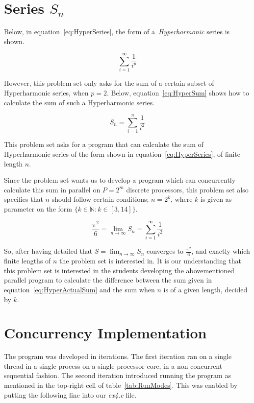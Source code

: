 \documentclass[fontsize=11pt,paper=a4,titlepage]{report}
\begin{document}
\section{Series $S_n$}

Below, in equation~\ref{eq:HyperSeries}, the form of a~\textit{Hyperharmonic}
series is shown.

\begin{equation}
	\sum_{i=1}^{\infty} \frac{1}{i^p}
	\label{eq:HyperSeries}
\end{equation}

However, this problem set only asks for the sum of a certain subset of
Hyperharmonic series, when $p = 2$. Below, equation~\ref{eq:HyperSum} shows how
to calculate the sum of such a Hyperharmonic series.

\begin{equation}
	S_n = \sum_{i=1}^{n} \frac{1}{i^2}
	\label{eq:HyperSum}
\end{equation}

This problem set asks for a program that can calculate the sum of Hyperharmonic
series of the form shown in equation~\ref{eq:HyperSeries}, of finite length $n$.

Since the problem set wants us to develop a program which can concurrently
calculate this sum in parallel on $P = 2^m$ discrete processors, this problem
set also specifies that $n$ should follow certain conditions; $n = 2^k$, where
$k$ is given as parameter on the form $\{k \in \mathbb{N} : k \in [3, 14]\}$.

\begin{equation}
	\frac{\pi^2}{6} = \lim_{n \to \infty}S_n = \sum_{i=1}^{\infty} \frac{1}{i^2}
	\label{eq:HyperActualSum}
\end{equation}

So, after having detailed that $S = \lim_{n \to \infty}S_n$ converges to $\frac{
\pi^2}{6}$, and exactly which finite lengths of $n$ the problem set is
interested in. It is our understanding that this problem set is interested in
the students developing the abovementioned parallel program to calculate the
difference between the sum given in equation~\ref{eq:HyperActualSum} and the sum
when $n$ is of a given length, decided by $k$.

\section{Concurrency Implementation}

The program was developed in iterations. The first iteration ran on a single
thread in a single process on a single processor core, in a non-concurrent
sequential fashion. The second iteration introduced running the program as
mentioned in the top-right cell of table~\ref{tab:RunModes}. This was enabled by
putting the following line into our \textit{ex4.c} file.
\end{document}
